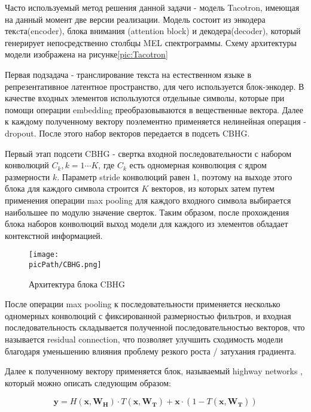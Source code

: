 \documentclass[oneside,final,14pt]{extreport}
\newcommand{\picPath}{pictures}
\begin{document}
Часто используемый метод решения данной задачи - модель Tacotron\cite{bib:Tacotron}, имеющая на данный момент две версии реализации. Модель состоит из энкодера текcта(encoder), блока внимания (attention block) и декодера(decoder), который генерирует непосредственно столбцы MEL спектрограммы. Схему архитектуры модели изображена на рисунке\ref{pic:Tacotron}

Первая подзадача - транслирование текста на естественном языке в репрезентативное латентное пространство, для чего используется блок-энкодер. В качестве входных элементов используются отдельные символы, которые при помощи операции embedding\cite{bib:pytorch} преобразовываются в вещественные вектора. Далее к каждому полученному вектору поэлементно применяется нелинейная операция - dropout\cite{bib:pytorch}.  После этого набор векторов передается в подсеть CBHG. 

Первый этап подсети CBHG - свертка входной последовательности с набором конволюций $C_k, k=1 \cdots K$, где $C_k$ есть одномерная конволюция с ядром размерности $k$. Параметр stride конволюций равен 1, поэтому на выходе этого блока для каждого символа строится $K$ векторов, из которых затем путем применения операции max pooling для каждого входного символа выбирается наибольшее по модулю значение сверток. Таким образом, после прохождения блока наборов конволюций выход модели для каждого из элементов обладает контекстной информацией.

\begin{figure}[H]
\begin{center}
\texttt{[image: \\picPath/CBHG.png]}
\end{center}
  \caption{Архитектура блока CBHG}
  \label{pic:CBHG}
  \end{figure}


После операции max pooling к последовательности применяется несколько одномерных конволюций с фиксированной размерностью фильтров, и входная последовательность складывается полученной последовательностью векторов, что называется residual connection, что позволяет улучшить сходимость модели благодаря уменьшению влияния проблему резкого роста / затухания градиента\cite{bib:resnet}.

Далее к полученному вектору применяется блок, называемый highway networks \cite{bib:highway_net}, который можно описать следующим образом:

\begin{equation}
\mathbf{y}=H\left(\mathbf{x}, \mathbf{W}_{\mathbf{H}}\right) \cdot T\left(\mathbf{x}, \mathbf{W}_{\mathbf{T}}\right)+\mathbf{x} \cdot\left(1-T\left(\mathbf{x}, \mathbf{W}_{\mathbf{T}}\right)\right)
\end{equation}
\end{document}
